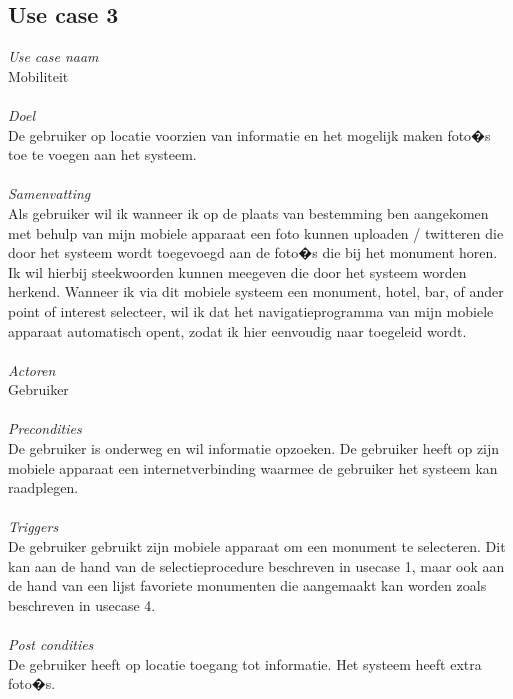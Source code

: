 \documentclass[a4paper,10pt]{article}
\begin{document}
		\subsection{Use case 3}
			\textit{Use case naam}\\
			Mobiliteit\\ \\
			\textit{Doel}\\
			De gebruiker op locatie voorzien van informatie en het mogelijk maken foto�s toe te voegen aan het systeem.\\ \\
			\textit{Samenvatting}\\
			Als gebruiker wil ik wanneer ik op de plaats van bestemming ben aangekomen met behulp van mijn mobiele apparaat een foto kunnen uploaden / twitteren die door het systeem wordt toegevoegd aan de foto�s die bij het monument horen. Ik wil hierbij steekwoorden kunnen meegeven die door het systeem worden herkend. Wanneer ik via dit mobiele systeem een monument, hotel, bar, of ander point of interest selecteer, wil ik dat het navigatieprogramma van mijn mobiele apparaat automatisch opent, zodat ik hier eenvoudig naar toegeleid wordt.\\ \\
			\textit{Actoren}\\
			Gebruiker\\ \\
			\textit{Precondities}\\
			De gebruiker is onderweg en wil informatie opzoeken. De gebruiker heeft op zijn mobiele apparaat een internetverbinding waarmee de gebruiker het systeem kan raadplegen.\\ \\
			\textit{Triggers}\\
			De gebruiker gebruikt zijn mobiele apparaat om een monument te selecteren. Dit kan aan de hand van de selectieprocedure beschreven in usecase 1, maar ook aan de hand van een lijst favoriete monumenten die aangemaakt kan worden zoals beschreven in usecase 4.\\ \\
			\textit{Post condities}\\
			De gebruiker heeft op locatie toegang tot informatie. Het systeem heeft extra foto�s.
		
\end{document}
